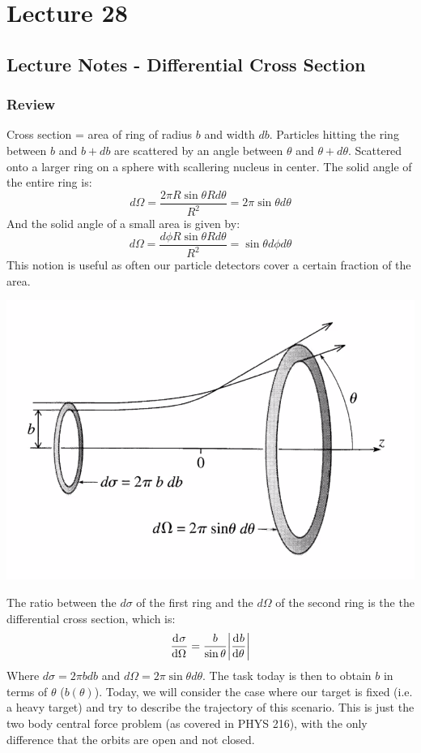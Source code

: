 \section{Lecture 28}
\subsection{Lecture Notes - Differential Cross Section}
\subsubsection{Review}
Cross section = area of ring of radius $b$ and width $db$. Particles hitting the ring between $b$ and $b + db$ are scattered by an angle between $\theta$ and $\theta + d\theta$. Scattered onto a larger ring on a sphere with scallering nucleus in center. The solid angle of the entire ring is:
\[d\Omega = \frac{2\pi R\sin\theta Rd\theta}{R^2} = 2\pi\sin\theta d\theta\]
And the solid angle of a small area is given by:
\[d\Omega = \frac{d\phi R\sin\theta Rd\theta}{R^2} = \sin\theta d\phi d\theta\]
This notion is useful as often our particle detectors cover a certain fraction of the area. 
\begin{center}
    \includegraphics[scale=0.5]{Lecture-28/l28-img1.png}
\end{center}
The ratio between the $d\sigma$ of the first ring and the $d\Omega$ of the second ring is the the differential cross section, which is:
\[\dod{\sigma}{\Omega} = \frac{b}{\sin\theta}\abs{\dod{b}{\theta}}\]
Where $d\sigma = 2\pi b db$ and $d\Omega = 2\pi \sin\theta d\theta$. The task today is then to obtain $b$ in terms of $\theta$ ($b(\theta)$). Today, we will consider the case where our target is fixed (i.e. a heavy target) and try to describe the trajectory of this scenario. This is just the two body central force problem (as covered in PHYS 216), with the only difference that the orbits are open and not closed.

